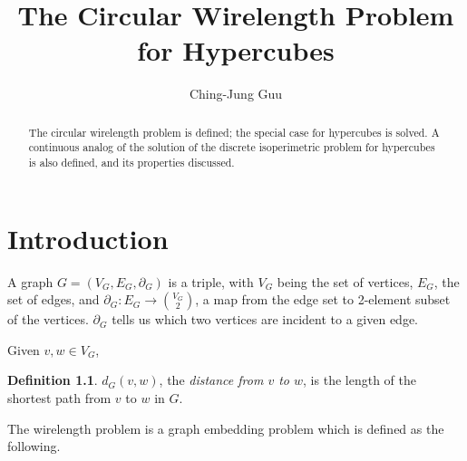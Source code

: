 \documentclass[12pt]{ucthesis}
\title{The Circular Wirelength Problem for Hypercubes}
\author{Ching-Jung Guu}
\theoremstyle{plain}
\theoremstyle{definition}
\newtheorem{definition}{Definition}
\begin{document}
\maketitle
\approvalpage
\copyrightpage

\begin{frontmatter}
\begin{abstract}
The circular wirelength problem is defined;
the special case for hypercubes is solved.
A continuous analog of the solution of the discrete isoperimetric problem
for hypercubes is also defined, and its properties discussed.
\end{abstract}

\tableofcontents

\end{frontmatter}

\chapter{Introduction}
\label{Chapter 1}

A graph $G = (V_G, E_G, \partial_G)$ is a triple,
with $V_G$ being the set of vertices, $E_G$, the set of edges,
and $\partial_G \colon E_G \rightarrow \binom{V_G}{2}$,
a map from the edge set to 2-element subset of the vertices.
$\partial_G$ tells us which two vertices are incident to a given edge.

Given $v, w \in V_G$,
\begin{definition}
\label{Definition 1}
$d_G(v, w)$, the \emph{distance from $v$ to $w$},
is the length of the shortest path from $v$ to $w$ in $G$.
\end{definition}

The wirelength problem is a graph embedding problem which is defined as the following.
\end{document}
